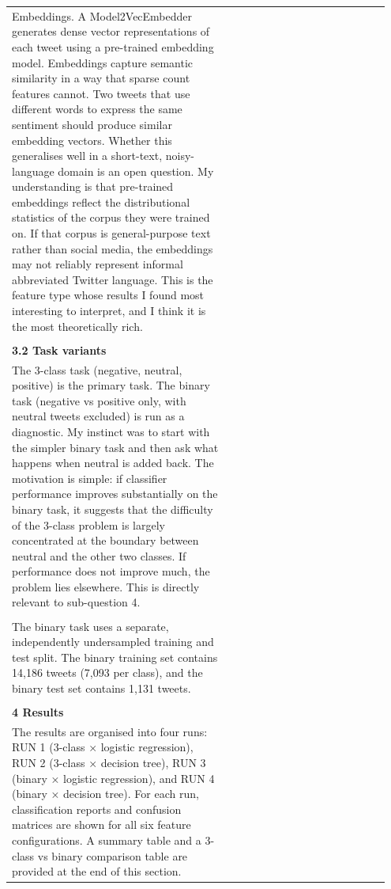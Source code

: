 \documentclass[11pt]{article}
\begin{document}
\begin{longtable}{|p{0.55\linewidth}|p{0.40\linewidth}|}
\hline
\rule{0pt}{3.5cm} & \\
\hline
Embeddings. A Model2VecEmbedder generates dense vector representations of each tweet using a pre-trained embedding model. Embeddings capture semantic similarity in a way that sparse count features cannot. Two tweets that use different words to express the same sentiment should produce similar embedding vectors. Whether this generalises well in a short-text, noisy-language domain is an open question. My understanding is that pre-trained embeddings reflect the distributional statistics of the corpus they were trained on. If that corpus is general-purpose text rather than social media, the embeddings may not reliably represent informal abbreviated Twitter language. This is the feature type whose results I found most interesting to interpret, and I think it is the most theoretically rich. & \\[2pt]
\hline
\rule{0pt}{3.5cm} & \\
\hline
\multicolumn{2}{|l|}{\textbf{3.2 Task variants}} \\[2pt]
\hline
The 3-class task (negative, neutral, positive) is the primary task. The binary task (negative vs positive only, with neutral tweets excluded) is run as a diagnostic. My instinct was to start with the simpler binary task and then ask what happens when neutral is added back. The motivation is simple: if classifier performance improves substantially on the binary task, it suggests that the difficulty of the 3-class problem is largely concentrated at the boundary between neutral and the other two classes. If performance does not improve much, the problem lies elsewhere. This is directly relevant to sub-question 4. & \\[2pt]
\hline
\rule{0pt}{3.5cm} & \\
\hline
The binary task uses a separate, independently undersampled training and test split. The binary training set contains 14,186 tweets (7,093 per class), and the binary test set contains 1,131 tweets. & \\[2pt]
\hline
\rule{0pt}{3.5cm} & \\
\hline
\multicolumn{2}{|l|}{\textbf{4 Results}} \\[2pt]
\hline
The results are organised into four runs: RUN 1 (3-class × logistic regression), RUN 2 (3-class × decision tree), RUN 3 (binary × logistic regression), and RUN 4 (binary × decision tree). For each run, classification reports and confusion matrices are shown for all six feature configurations. A summary table and a 3-class vs binary comparison table are provided at the end of this section. & \\[2pt]

\end{longtable}
\end{document}
